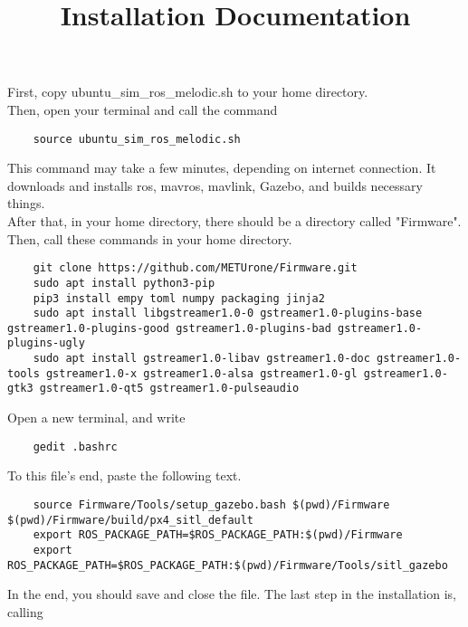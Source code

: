 \documentclass{article}
\title{Installation Documentation}
\begin{document}
\maketitle

\section*{}
\subsection*{}
First, copy ubuntu\_sim\_ros\_melodic.sh to your home directory. \\
Then, open your terminal and call the command \\
\begin{verbatim}
    source ubuntu_sim_ros_melodic.sh
\end{verbatim}
\noindent
This command may take a few minutes, depending on internet connection. It downloads and installs ros, mavros, mavlink, Gazebo, and builds necessary things. \\
After that, in your home directory, there should be a directory called "Firmware". \\
\noindent
Then, call these commands in your home directory. \\
\begin{verbatim}
    git clone https://github.com/METUrone/Firmware.git
    sudo apt install python3-pip
    pip3 install empy toml numpy packaging jinja2
    sudo apt install libgstreamer1.0-0 gstreamer1.0-plugins-base gstreamer1.0-plugins-good gstreamer1.0-plugins-bad gstreamer1.0-plugins-ugly
    sudo apt install gstreamer1.0-libav gstreamer1.0-doc gstreamer1.0-tools gstreamer1.0-x gstreamer1.0-alsa gstreamer1.0-gl gstreamer1.0-gtk3 gstreamer1.0-qt5 gstreamer1.0-pulseaudio
\end{verbatim}
\noindent
Open a new terminal, and write \\
\begin{verbatim}
    gedit .bashrc
\end{verbatim}
\noindent
To this file's end, paste the following text. \\
\begin{verbatim}
    source Firmware/Tools/setup_gazebo.bash $(pwd)/Firmware $(pwd)/Firmware/build/px4_sitl_default
    export ROS_PACKAGE_PATH=$ROS_PACKAGE_PATH:$(pwd)/Firmware
    export ROS_PACKAGE_PATH=$ROS_PACKAGE_PATH:$(pwd)/Firmware/Tools/sitl_gazebo
\end{verbatim}
\noindent
In the end, you should save and close the file. The last step in the installation is, calling \\
\end{document}
